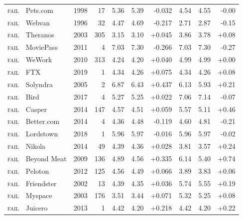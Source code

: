 \begin{tabular}{lllrrrrrrr}
\textsc{fail} & Pets.com & 1998 & 17 & 5.36 & 5.39 & -0.032 & 4.54 & 4.55 & -0.00 \\
\textsc{fail} & Webvan & 1996 & 32 & 4.47 & 4.69 & -0.217 & 2.71 & 2.87 & -0.15 \\
\textsc{fail} & Theranos & 2003 & 305 & 3.15 & 3.10 & +0.045 & 3.86 & 3.78 & +0.08 \\
\textsc{fail} & MoviePass & 2011 & 4 & 7.03 & 7.30 & -0.266 & 7.03 & 7.30 & -0.27 \\
\textsc{fail} & WeWork & 2010 & 313 & 4.24 & 4.20 & +0.040 & 4.99 & 4.99 & +0.00 \\
\textsc{fail} & FTX & 2019 & 1 & 4.34 & 4.26 & +0.075 & 4.34 & 4.26 & +0.08 \\
\textsc{fail} & Solyndra & 2005 & 2 & 6.87 & 6.43 & +0.437 & 6.13 & 5.93 & +0.21 \\
\textsc{fail} & Bird & 2017 & 4 & 5.27 & 5.25 & +0.022 & 7.06 & 7.14 & -0.07 \\
\textsc{fail} & Casper & 2014 & 147 & 4.57 & 4.51 & +0.059 & 5.57 & 5.11 & +0.46 \\
\textsc{fail} & Better.com & 2014 & 4 & 4.36 & 4.48 & -0.119 & 4.60 & 4.81 & -0.21 \\
\textsc{fail} & Lordstown & 2018 & 1 & 5.96 & 5.97 & -0.016 & 5.96 & 5.97 & -0.02 \\
\textsc{fail} & Nikola & 2014 & 49 & 4.39 & 4.36 & +0.028 & 3.81 & 3.57 & +0.24 \\
\textsc{fail} & Beyond Meat & 2009 & 136 & 4.89 & 4.56 & +0.335 & 6.14 & 5.40 & +0.74 \\
\textsc{fail} & Peloton & 2012 & 125 & 4.56 & 4.49 & +0.066 & 3.89 & 3.83 & +0.06 \\
\textsc{fail} & Friendster & 2002 & 13 & 4.39 & 4.35 & +0.036 & 5.74 & 5.55 & +0.19 \\
\textsc{fail} & Myspace & 2003 & 176 & 3.51 & 3.44 & +0.071 & 5.32 & 5.25 & +0.08 \\
\textsc{fail} & Juicero & 2013 & 1 & 4.42 & 4.20 & +0.218 & 4.42 & 4.20 & +0.22 \\
\bottomrule
\end{tabular}